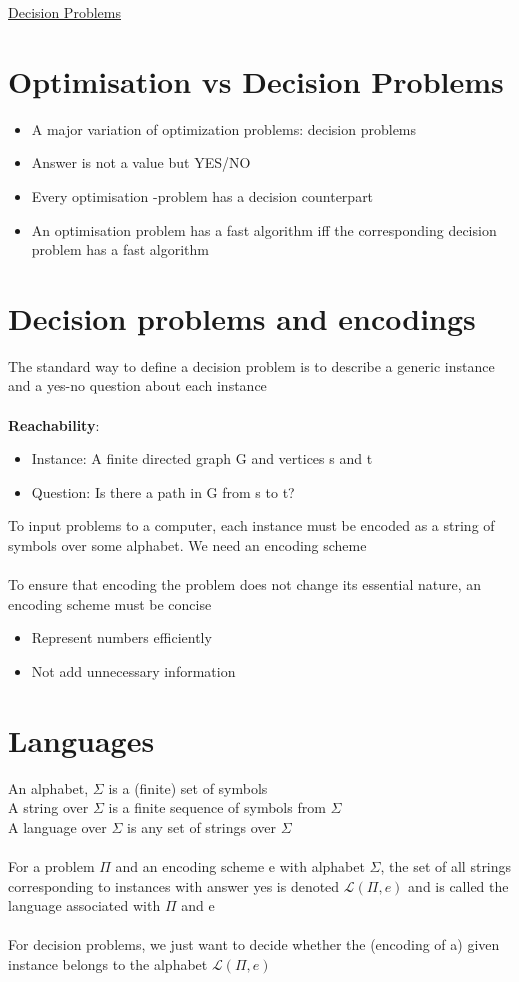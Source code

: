 \documentclass{article}[18pt]
\begin{document}
\begin{center}
\underline{\huge Decision Problems}
\end{center}
\section{Optimisation vs Decision Problems}
\begin{itemize}
	\item A major variation of optimization problems: decision problems
	\item Answer is not a value but YES/NO
	\item Every optimisation -problem has a decision counterpart
	\item An optimisation problem has a fast algorithm iff the corresponding decision problem has a fast algorithm
\end{itemize}
\section{Decision problems and encodings}
The standard way to define a decision problem is to describe a generic instance and a yes-no question about each instance\\
\\
\textbf{Reachability}:
\begin{itemize}
	\item Instance: A finite directed graph G and vertices s and t
	\item Question: Is there a path in G from s to t?
\end{itemize}
To input problems to a computer, each instance must be encoded as a string of symbols over some alphabet. We need an encoding scheme\\
\\
To ensure that encoding the problem does not change its essential nature, an encoding scheme must be concise
\begin{itemize}
	\item Represent numbers efficiently
	\item Not add unnecessary information
\end{itemize}
\section{Languages}
An alphabet, $\Sigma$ is a (finite) set of symbols\\
A string over $\Sigma$ is a finite sequence of symbols from $\Sigma$\\
A language over $\Sigma$ is any set of strings over $\Sigma$\\
\\
For a problem $\Pi$ and an encoding scheme e with alphabet $\Sigma$, the set of all strings corresponding to instances with answer yes is denoted $\mathscr{L}(\Pi,e)$ and is called the language associated with $\Pi$ and e\\
\\
For decision problems, we just want to decide whether the (encoding of a) given instance belongs to the alphabet $\mathscr{L}(\Pi, e)$
\end{document}
